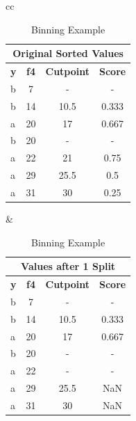 \documentclass[pdflatex,sn-mathphys-num]{sn-jnl}%
\let\oldcaption\caption
\renewcommand{\caption}[1]{\oldcaption{\centering #1}}
\theoremstyle{thmstyleone}%
\theoremstyle{thmstyletwo}%
\theoremstyle{thmstylethree}%
\begin{document}
\begin{table}[ht!]
  \centering
  \caption{Binning Example}
  \label{tab:binning_example}
  \begin{tabular}{cc}
    \begin{tabular}{|l|c|c|c|}
      \hline
      \multicolumn{4}{|c|}{Original Sorted Values} \\ \hline
      \textbf{y} & \textbf{f4} & \textbf{Cutpoint} & \textbf{Score} \\ \hline
      b          & 7           & -                 & -              \\
      b          & 14          & 10.5              & 0.333          \\
      a          & 20          & 17                & 0.667          \\
      b          & 20          & -                 & -              \\
      a          & 22          & 21                & 0.75           \\
      a          & 29          & 25.5              & 0.5            \\
      a          & 31          & 30                & 0.25           \\ \hline
    \end{tabular}
      &
    \begin{tabular}{|l|c|c|c|}
      \hline
      \multicolumn{4}{|c|}{Values after 1 Split} \\ \hline
      \textbf{y} & \textbf{f4} & \textbf{Cutpoint} & \textbf{Score} \\ \hline
      b          & 7           & -                 & -              \\
      b          & 14          & 10.5              & 0.333          \\
      a          & 20          & 17                & 0.667          \\
      b          & 20          & -                 & -              \\ \hline
      a          & 22          & -                 & -              \\
      a          & 29          & 25.5              & NaN            \\
      a          & 31          & 30                & NaN            \\ \hline
    \end{tabular}
    \\ \\

\end{tabular}
\end{table}
\end{document}
